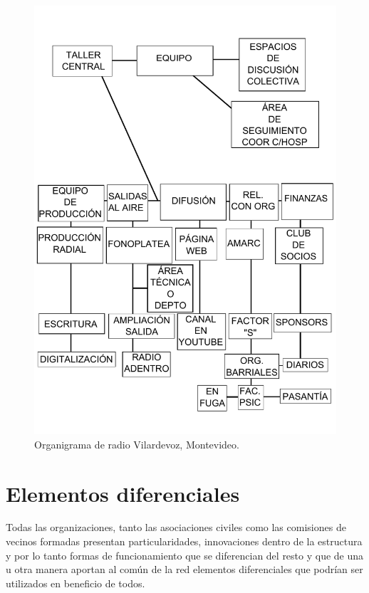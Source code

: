 \begin{figure}[htbp]
 \centering
 \includegraphics[scale=0.7]{./Cap/Organigramas/vilar.pdf}
 \caption{Organigrama de radio Vilardevoz, Montevideo.}
 \label{OrgVilardevoz}
\end{figure}
\newpage
\section{Elementos diferenciales}

Todas las organizaciones, tanto las asociaciones civiles como las comisiones de vecinos formadas presentan particularidades, innovaciones dentro de la estructura y por lo tanto formas de funcionamiento que se diferencian del resto y que de una u otra manera aportan al común de la red elementos diferenciales que podrían ser utilizados en beneficio de todos.\\

